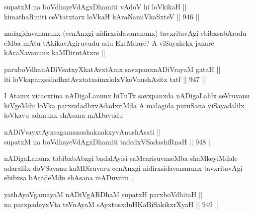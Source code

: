 
\begin{shl}
supatxM na boVdhayeVdAgxDhamiti vAdoV hi loVkikaH || \\
kimathaRmiti ceVtatxtarx loVkaH kAraNamiVkaSxteV ||  946 ||  
\end{shl}

\begin{artha}
malagidavananunx (cenAnxgi nidirxsidavananunx) tavxritavAgi ebibxsabAradu eMba mAtu tAkikavAgiruvudu adu EkeMdare? A viSayakekx janare kAraNavanunx kaMDirutAtxre ||
\end{artha}


\begin{shl}
parxboVdhanADiVsatxyXkatAvx\s \s tAmx savxpanxnADiVrayaM gataH || \\
iti loVkaparxsidadhxtAvxtatxsimxlolxVkoV\s nushAsitx tatf ||  947 ||  
\end{shl}

\begin{artha}
I Atamx vicacxrina nADigaLanunx biTuTx savxpanxda nADigaLalilx seVruvanu hiVgeMdu loVka parxsidadhxvAdadxriMda A malagida puruSana viSayadalilx loVkavu adanunx shAsana mADuvudu || 
\end{artha}


\begin{shl}
nADiVvayxtAyxsagamanashaknakxyvAnushAsati || \\
supatxM na boVdhayeVdAgxDhamiti tadedxVSadashiRnaH ||  948 ||  
\end{shl}

\begin{artha}
nADigaLanunx tabibxbAbxgi badalAyisi saMcarisuvaneMba shaMkeyiMdale adaralilx doVSavanu kaMDiruvaru cenAnxgi nidirxsidavananunx tavxritavAgi ebibxsa bAradeMdu shAsana mADuvaru ||
\end{artha}


\begin{shl}
yathAyoVgamayaM nADiVgARDhaM supatxH parxboVdhitaH || \\
na parxpadeyxVta teVnAyaM sAyxtusxduHKaBiSakikxrXyaH ||  949 ||   
\end{shl}

